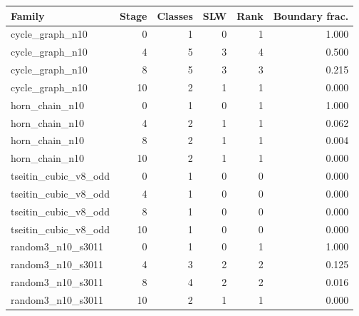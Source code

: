 \begin{tabular}{lrrrrr}
\toprule
Family & Stage & Classes & SLW & Rank & Boundary frac. \\
\midrule
cycle\_graph\_n10 & 0 & 1 & 0 & 1 & 1.000 \\
cycle\_graph\_n10 & 4 & 5 & 3 & 4 & 0.500 \\
cycle\_graph\_n10 & 8 & 5 & 3 & 3 & 0.215 \\
cycle\_graph\_n10 & 10 & 2 & 1 & 1 & 0.000 \\
horn\_chain\_n10 & 0 & 1 & 0 & 1 & 1.000 \\
horn\_chain\_n10 & 4 & 2 & 1 & 1 & 0.062 \\
horn\_chain\_n10 & 8 & 2 & 1 & 1 & 0.004 \\
horn\_chain\_n10 & 10 & 2 & 1 & 1 & 0.000 \\
tseitin\_cubic\_v8\_odd & 0 & 1 & 0 & 0 & 0.000 \\
tseitin\_cubic\_v8\_odd & 4 & 1 & 0 & 0 & 0.000 \\
tseitin\_cubic\_v8\_odd & 8 & 1 & 0 & 0 & 0.000 \\
tseitin\_cubic\_v8\_odd & 10 & 1 & 0 & 0 & 0.000 \\
random3\_n10\_s3011 & 0 & 1 & 0 & 1 & 1.000 \\
random3\_n10\_s3011 & 4 & 3 & 2 & 2 & 0.125 \\
random3\_n10\_s3011 & 8 & 4 & 2 & 2 & 0.016 \\
random3\_n10\_s3011 & 10 & 2 & 1 & 1 & 0.000 \\
\bottomrule
\end{tabular}